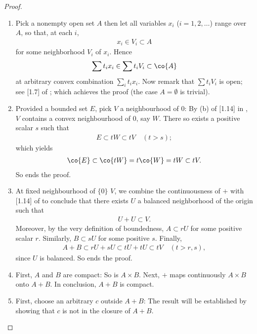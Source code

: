 \begin{proof}
\renewcommand{\labelenumi}{(\arabic{enumi})} 
\begin{enumerate}
\item 
Pick a nonempty open set $A$ then let all variables %
$\mathit{x_i}$ ($i=1, 2, \dots$) range over $A$, %
so that, at each $i$,  %
%
\begin{align}
  x_i \in V_i \subset A 
\end{align}
%
for some neighborhood $V_i$ of $x_i$. %
%
Hence 
%
\begin{align}
  \sum t_i x_i \in \sum t_i V_i  \subset \co{A}
\end{align}
%
at arbitrary convex combination $\sum_i t_i x_i$. %
Now remark that $\sum t_i V_i$ is open; see [1.7] of \cite{FA}; %
which achieves the proof (the case $A=\emptyset$ is trivial). %
%
\item Provided a bounded set $E$, %
pick $V$ a neighbourhood of $0$: By (b) of [1.14] in \cite{FA}, %
$V$ contains a convex neighbourhood of $0$, say $W$. %
%
There so exists a positive scalar $s$ such that
%
\begin{align}
  E \subset tW \subset tV \quad (t>s); 
\end{align}
%
which yields %
%
\begin{align}
  \co{E} \subset \co{tW} = t\co{W} = t W \subset tV.
\end{align}
%
So ends the proof. %
%
\item At fixed neighbourhood of $\{0\}$ $V$, %
we combine the continuousness of $+$ with [1.14] of \cite{FA} %
to conclude that there exists $U$ a balanced neighborhood of the origin %
such that %
%
\begin{align}
  U+U\subset V. 
\end{align}
%
Moreover, by the very definition of boundedness, %
$A \subset r U$ for some positive scalar $r$. %
Similarly, $B \subset s U$ for some positive $s$. %
%
Finally, 
%
\begin{align}
A+B \subset  rU + sU \subset tU + tU \subset tV \quad (t > r, s), 
\end{align}
%
since $U$ is balanced. So ends the proof. %
%
\item First, $A$ and $B$ are compact: So is $A\times B$. %
Next, $+$ maps continuously $A\times B$ onto $A+B$. %
In conclusion, $A+B$ is compact. %
%
\item First, choose an arbitrary $c$ outside $A+B$: %
The result will be established by showing that $c$ is not in the closure %
of $A+B$. %

\end{enumerate}
\end{proof}
